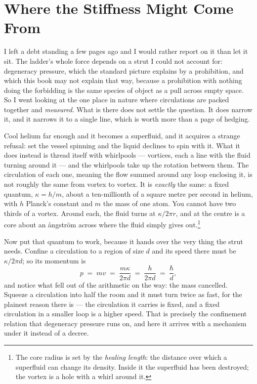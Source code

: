 \section{Where the Stiffness Might Come From}

I left a debt standing a few pages ago and I would rather report on it than let it sit. The ladder's whole force depends on a strut I could not account for: degeneracy pressure, which the standard picture explains by a prohibition, and which this book may not explain that way, because a prohibition with nothing doing the forbidding is the same species of object as a pull across empty space. So I went looking at the one place in nature where circulations are packed together and \emph{measured}. What is there does not settle the question. It does narrow it, and it narrows it to a single line, which is worth more than a page of hedging.

Cool helium far enough and it becomes a superfluid, and it acquires a strange refusal: set the vessel spinning and the liquid declines to spin with it. What it does instead is thread itself with whirlpools --- vortices, each a line with the fluid turning around it --- and the whirlpools take up the rotation between them. The circulation of each one, meaning the flow summed around any loop enclosing it, is not roughly the same from vortex to vortex. It is \emph{exactly} the same: a fixed quantum, $\kappa = h/m$, about a ten-millionth of a square metre per second in helium, with $h$ Planck's constant and $m$ the mass of one atom. You cannot have two thirds of a vortex. Around each, the fluid turns at $\kappa/2\pi r$, and at the centre is a core about an \aa ngstr\"om across where the fluid simply gives out.\footnote{The core radius is set by the \emph{healing length}: the distance over which a superfluid can change its density. Inside it the superfluid has been destroyed; the vortex is a hole with a whirl around it.}

Now put that quantum to work, because it hands over the very thing the strut needs. Confine a circulation to a region of size $d$ and its speed there must be $\kappa/2\pi d$; so its momentum is
\[
p \;=\; m v \;=\; \frac{m\kappa}{2\pi d} \;=\; \frac{h}{2\pi d} \;=\; \frac{\hbar}{d},
\]
and notice what fell out of the arithmetic on the way: the mass cancelled. Squeeze a circulation into half the room and it must turn twice as fast, for the plainest reason there is --- the circulation it carries is fixed, and a fixed circulation in a smaller loop is a higher speed. That is precisely the confinement relation that degeneracy pressure runs on, and here it arrives with a mechanism under it instead of a decree.

